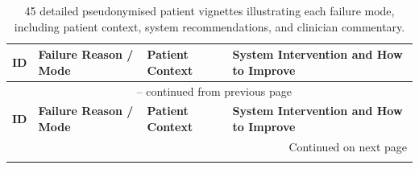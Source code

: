 \label{app:failure-vignettes}
{\scriptsize
            \begin{longtable}{p{}p{}p{}p{}}
                \caption{45 detailed pseudonymised patient vignettes illustrating each failure mode, including patient context, system recommendations, and clinician commentary.}

                \label{tab:overconfidence-examples} \\
                \toprule
                \textbf{ID} & \textbf{Failure Reason / Mode} & \textbf{Patient Context} & \textbf{System Intervention and How to Improve} \\
                \midrule
                \endfirsthead
            
                \multicolumn{4}{c}{\tablename\ \thetable{} -- continued from previous page} \\
                \toprule
                \textbf{ID} & \textbf{Failure Reason / Mode} & \textbf{Patient Context} & \textbf{System Intervention and How to Improve} \\
                \midrule
                \endhead
            
                \midrule
                \multicolumn{4}{r}{Continued on next page} \\
                \endfoot
            
                \bottomrule
                \endlastfoot
            

\end{longtable}}
